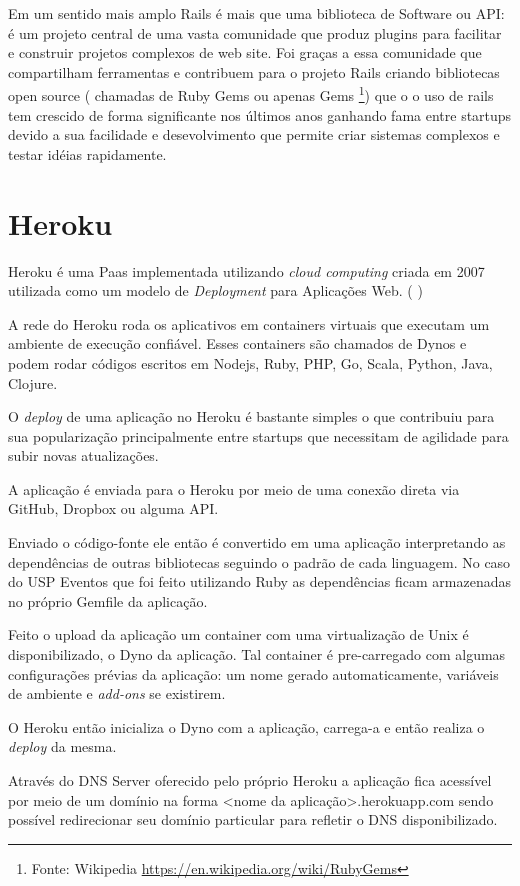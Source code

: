     \par Em um sentido mais amplo Rails é mais que uma biblioteca de Software ou API: é um projeto central de uma vasta comunidade que produz plugins para facilitar e construir projetos complexos de web site. Foi graças a essa comunidade que compartilham ferramentas e contribuem para o projeto Rails criando bibliotecas open source ( chamadas de Ruby Gems ou apenas Gems \footnote{Fonte: Wikipedia \url{https://en.wikipedia.org/wiki/RubyGems}}) que o o uso de rails tem crescido de forma significante nos últimos anos ganhando fama entre startups devido a sua  facilidade e desevolvimento que permite criar sistemas complexos e testar idéias rapidamente.

\section{Heroku}
\par Heroku é uma Paas implementada utilizando \emph{cloud computing} criada em 2007 utilizada como um modelo de \emph{Deployment} para Aplicações Web. ( \cite{herokuwiki})
\par A rede do Heroku roda os aplicativos em containers virtuais que executam um ambiente de execução confiável. Esses containers são chamados de Dynos e podem rodar códigos escritos em Nodejs, Ruby, PHP, Go, Scala, Python, Java, Clojure.
\par O \emph{deploy} de uma aplicação no Heroku é bastante simples o que contribuiu para sua popularização principalmente entre startups que necessitam de agilidade para subir novas atualizações.
\par A aplicação é enviada para o Heroku por meio de uma conexão direta via GitHub, Dropbox ou alguma API.
\par Enviado o código-fonte ele então é convertido em uma aplicação interpretando as dependências de outras bibliotecas seguindo o padrão de cada linguagem. No caso do USP Eventos que foi feito utilizando Ruby as dependências ficam armazenadas no próprio Gemfile da aplicação.
\par Feito o upload da aplicação um container com uma virtualização de Unix é disponibilizado, o Dyno da aplicação. Tal container é pre-carregado com algumas configurações prévias da aplicação: um nome gerado automaticamente, variáveis de ambiente e \emph{add-ons} se existirem.
\par O Heroku então inicializa o Dyno com a aplicação, carrega-a e então realiza o \emph{deploy} da mesma.
\par Através do DNS Server oferecido pelo próprio Heroku a aplicação fica acessível por meio de um domínio na forma <nome da aplicação>.herokuapp.com sendo possível redirecionar seu domínio particular para refletir o DNS disponibilizado.
